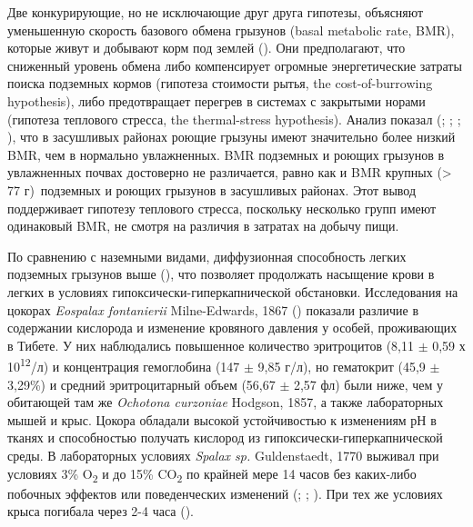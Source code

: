 

Две конкурирующие, но не исключающие друг друга гипотезы, объясняют уменьшенную скорость базового обмена грызунов (basal metabolic rate, BMR), которые живут и добывают корм под землей (\cite{White2003}). Они предполагают, что сниженный уровень обмена либо компенсирует огромные энергетические затраты поиска подземных кормов (гипотеза стоимости рытья, the cost-of-burrowing hypothesis), либо предотвращает перегрев в системах с закрытыми норами (гипотеза теплового стресса, the thermal-stress hypothesis). Анализ показал (\cite{White2003}; \cite{McNab1966}; \cite{Vleck1979}; \cite{Gorecki1969}), что в засушливых районах роющие грызуны имеют значительно более низкий BMR, чем в нормально увлажненных. BMR подземных и роющих грызунов в увлажненных почвах достоверно не различается, равно как и BMR крупных (> 77 г) подземных и роющих грызунов в засушливых районах. Этот вывод поддерживает гипотезу теплового стресса, поскольку несколько групп имеют одинаковый BMR, не смотря на различия в затратах на добычу пищи. 



По сравнению с наземными видами, диффузионная способность легких подземных грызунов выше (\cite{Widmer1997}), что позволяет продолжать насыщение крови в легких в условиях гипоксически-гиперкапнической обстановки. Исследования на цокорах \textit{Eospalax fontanierii} Milne-Edwards, 1867 (\cite{Wei2006}) показали различие в содержании кислорода и изменение кровяного давления у особей, проживающих в Тибете. У них наблюдались повышенное количество эритроцитов (8,11 $\pm$ 0,59 х 10\textsuperscript{12}/л) и концентрация гемоглобина (147 $\pm$ 9,85 г/л), но гематокрит (45,9 $\pm$ 3,29\%) и средний эритроцитарный объем (56,67 $\pm$ 2,57 фл) были ниже, чем у обитающей там же \textit{Ochotona curzoniae} Hodgson, 1857, а также лабораторных мышей и крыс. Цокора обладали высокой устойчивостью к изменениям рН в тканях и способностью получать кислород из гипоксически-гиперкапнической среды. В лабораторных условиях \textit{Spalax sp.} Guldenstaedt, 1770 выживал при условиях 3\% O\textsubscript{2} и до 15\% CO\textsubscript{2} по крайней мере 14 часов без каких-либо побочных эффектов или поведенческих изменений (\cite{Avivi1999}; \cite{Shams2005a}; \cite{Shams2005}). При тех же условиях крыса погибала через 2-4 часа (\cite{Avivi1999}). 

